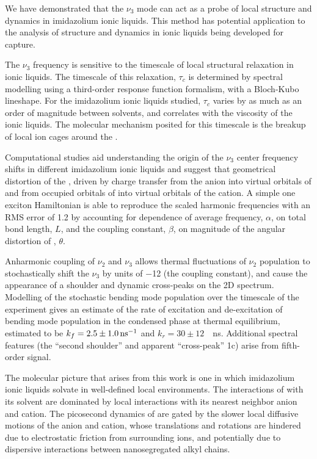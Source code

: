 {We have demonstrated that the  \(\nu_3\) mode can act as a probe of local structure and dynamics in imidazolium ionic liquids. This method has potential application to the analysis of structure and dynamics in ionic liquids being developed for  capture.

The \(\nu_3\) frequency is sensitive to the timescale of local structural relaxation in ionic liquids. The timescale of this relaxation, \(\tau_c\) is determined by spectral modelling using a third-order response function formalism, with a Bloch-Kubo lineshape. For the imidazolium ionic liquids studied, \(\tau_c\) varies by as much as an order of magnitude between solvents, and correlates with the viscosity of the ionic liquids. The molecular mechanism posited for this timescale is the breakup of local ion cages around the .

Computational studies aid understanding the origin of the \(\nu_3\) center frequency shifts in different imidazolium ionic liquids and suggest that geometrical distortion of the , driven by charge transfer from the anion into virtual orbitals of  and from occupied orbitals of  into virtual orbitals of the cation. A simple one exciton Hamiltonian is able to reproduce the scaled harmonic frequencies with an RMS error of \SI{1.2}{\wavenumber} by accounting for dependence of average frequency, \(\alpha\), on total bond length, \(L\), and the coupling constant, \(\beta\), on magnitude of the angular distortion of , \(\theta\).

Anharmonic coupling of \(\nu_2\) and \(\nu_3\) allows thermal fluctuations of \(\nu_2\) population to stochastically shift the  \(\nu_3\) by units of \SI{-12}{\wavenumber} (the coupling constant), and cause the appearance of a shoulder and dynamic cross-peaks on the 2D spectrum. Modelling of the stochastic bending mode population over the timescale of the experiment gives an estimate of the rate of excitation and de-excitation of bending mode population in the condensed phase at thermal equilibrium, estimated to be \(k_{f} = \SI{2.5 \pm 1}{\per\ns}\) and $k_r = 30\pm12$~\si{\per\ns}. Additional spectral features (the ``second shoulder'' and apparent ``cross-peak'' 1c) arise from fifth-order signal.

The molecular picture that arises from this work is one in which imidazolium ionic liquids solvate  in well-defined local environments. The interactions of  with its solvent are dominated by local interactions with its nearest neighbor anion and cation. The picosecond dynamics of  are gated by the slower local diffusive motions of the anion and cation, whose translations and rotations are hindered due to electrostatic friction from surrounding ions, and potentially due to dispersive interactions between nanosegregated alkyl chains.

}
